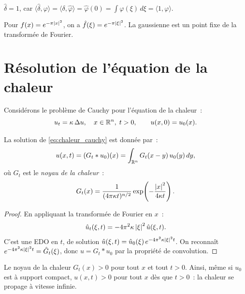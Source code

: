 \begin{exemple}
$\hat{\delta} = 1$, car $\langle \hat{\delta}, \varphi \rangle = \langle \delta, \hat{\varphi} \rangle
= \hat{\varphi}(0) = \int \varphi(\xi)\, d\xi = \langle 1, \varphi \rangle$.
\end{exemple}

\begin{exemple}
Pour $f(x) = e^{-\pi \left| x \right|^2}$, on a $\hat{f}(\xi) = e^{-\pi \left| \xi \right|^2}$.
La gaussienne est un point fixe de la transform\'ee de Fourier.
\end{exemple}

\section{R\'esolution de l'\'equation de la chaleur}

Consid\'erons le probl\`eme de Cauchy pour l'\'equation de la chaleur~:
\begin{equation}\label{eq:chaleur_cauchy}
    u_t = \kappa\, \Delta u, \quad x \in \mathbb{R}^n,\; t > 0, \qquad
    u(x, 0) = u_0(x).
\end{equation}

\begin{theoreme}
\label{thm:chaleur_fourier}
La solution de \eqref{eq:chaleur_cauchy} est donn\'ee par~:
\[
    u(x, t) = (G_t * u_0)(x) = \int_{\mathbb{R}^n} G_t(x - y)\, u_0(y)\, dy,
\]
o\`u $G_t$ est le \emph{noyau de la chaleur}~:
\[
    G_t(x) = \frac{1}{(4\pi \kappa t)^{n/2}} \exp\!\left(-\frac{\left| x \right|^2}{4\kappa t}\right).
\]
\end{theoreme}

\begin{proof}
En appliquant la transform\'ee de Fourier en $x$~:
\[
    \hat{u}_t(\xi, t) = -4\pi^2 \kappa \left| \xi \right|^2 \hat{u}(\xi, t).
\]
C'est une EDO en $t$, de solution $\hat{u}(\xi, t) = \hat{u}_0(\xi)\, e^{-4\pi^2 \kappa \left| \xi \right|^2 t}$.
On reconna\^it $e^{-4\pi^2 \kappa \left| \xi \right|^2 t} = \hat{G}_t(\xi)$, donc
$u = G_t * u_0$ par la propri\'et\'e de convolution.
\end{proof}

\begin{attention}[title=\textbf{Propagation instantan\'ee}]
Le noyau de la chaleur $G_t(x) > 0$ pour tout $x$ et tout $t > 0$. Ainsi,
m\^eme si $u_0$ est \`a support compact, $u(x, t) > 0$ pour tout $x$ d\`es que
$t > 0$~: la chaleur se propage \`a vitesse infinie.
\end{attention}

